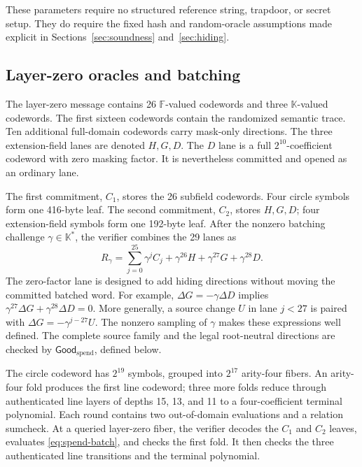 These parameters require no structured reference string, trapdoor, or secret
setup.  They do require the fixed hash and random-oracle assumptions made
explicit in Sections~\ref{sec:soundness} and~\ref{sec:hiding}.

\subsection{Layer-zero oracles and batching}

The layer-zero message contains 26 \(\mathbb F\)-valued codewords and three
\(\mathbb K\)-valued codewords.  The first sixteen codewords contain the
randomized semantic trace.  Ten additional full-domain codewords carry
mask-only directions.  The three extension-field lanes are denoted
\(H,G,D\).  The \(D\) lane is a full \(2^{10}\)-coefficient codeword with
zero masking factor.  It is nevertheless committed and opened as an ordinary
lane.

The first commitment, \(C_1\), stores the 26 subfield codewords.  Four circle
symbols form one 416-byte leaf.  The second commitment, \(C_2\), stores
\(H,G,D\); four extension-field symbols form one 192-byte leaf.  After the
nonzero batching challenge \(\gamma\in\mathbb K^*\), the verifier combines
the 29 lanes as
\begin{equation}
 R_\gamma=\sum_{j=0}^{25}\gamma^j C_j
              +\gamma^{26}H+\gamma^{27}G+\gamma^{28}D.
 \label{eq:spend-batch}
\end{equation}
The zero-factor lane is designed to add hiding directions without moving the
committed batched word.  For example,
\(
  \Delta G=-\gamma\Delta D
\)
implies
\(
 \gamma^{27}\Delta G+\gamma^{28}\Delta D=0
\).
More generally, a source change \(U\) in lane \(j<27\) is paired with
\(\Delta G=-\gamma^{j-27}U\).  The nonzero sampling of \(\gamma\) makes these
expressions well defined.  The complete source family and the legal
root-neutral directions are checked by \(\mathsf{Good}_{\mathrm{spend}}\), defined below.

The circle codeword has \(2^{19}\) symbols, grouped into \(2^{17}\)
arity-four fibers.  An arity-four fold produces the first line codeword; three
more folds reduce through authenticated line layers of depths 15, 13, and 11
to a four-coefficient terminal polynomial.  Each round contains two
out-of-domain evaluations and a relation sumcheck.  At a queried layer-zero
fiber, the verifier decodes the \(C_1\) and \(C_2\) leaves, evaluates
\eqref{eq:spend-batch}, and checks the first fold.  It then checks the
three authenticated line transitions and the terminal polynomial.

